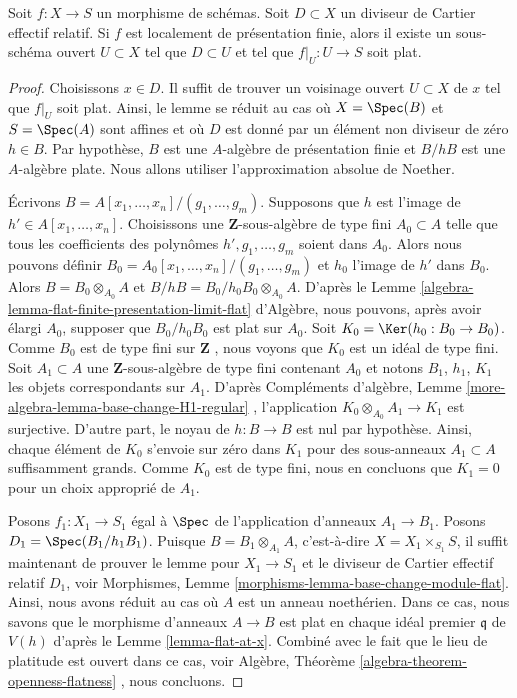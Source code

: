 \begin{lemma}
\label{lemma-flat-relative-Cartier-divisor}
Soit  $f : X \to S$  un morphisme de schémas. Soit  $D \subset X$  un diviseur de
Cartier effectif relatif. Si  $f$  est localement de présentation finie,
alors il existe un sous-schéma ouvert  $U \subset X$  tel que  $D \subset U$  et tel que
 $f|_U : U \to S$  soit plat.
\end{lemma}

\begin{proof}
Choisissons  $x \in D$. Il suffit de trouver un voisinage ouvert  $U \subset X$  de
 $x$  tel que  $f|_U$  soit plat. Ainsi, le lemme se réduit au cas où
 $X = \Spec(B)$  et  $S = \Spec(A)$  sont affines et où  $D$  est donné par un
élément non diviseur de zéro  $h \in B$. Par hypothèse,  $B$  est une
 $A$-algèbre de présentation finie et  $B/hB$  est une
 $A$-algèbre plate. Nous allons utiliser l'approximation absolue de
Noether.

\medskip\noindent
Écrivons  $B = A[x_1, \ldots, x_n]/(g_1, \ldots, g_m)$. Supposons que  $h$  est l'image de  $h' \in A[x_1, \ldots, x_n]$.
Choisissons une  $\mathbf{Z}$-sous-algèbre de type fini  $A_0 \subset A$  telle que tous les
coefficients des polynômes  $h', g_1, \ldots, g_m$  soient dans  $A_0$. Alors nous
pouvons définir  $B_0 = A_0[x_1, \ldots, x_n]/(g_1, \ldots, g_m)$  et  $h_0$  l'image de  $h'$  dans
 $B_0$. Alors  $B = B_0 \otimes_{A_0} A$  et  $B/hB = B_0/h_0B_0 \otimes_{A_0} A$. D'après le Lemme  \ref{algebra-lemma-flat-finite-presentation-limit-flat} 
d'Algèbre, nous pouvons, après avoir élargi  $A_0$, supposer que
 $B_0/h_0B_0$  est plat sur  $A_0$. Soit  $K_0 = \Ker(h_0 : B_0 \to B_0)$. Comme  $B_0$  est
de type fini sur  $\mathbf{Z}$ , nous voyons que  $K_0$  est un idéal de type
fini. Soit  $A_1 \subset A$  une  $\mathbf{Z}$-sous-algèbre de type fini contenant
 $A_0$  et notons  $B_1$,  $h_1$,  $K_1$  les objets
correspondants sur  $A_1$. D'après Compléments d'algèbre, Lemme  \ref{more-algebra-lemma-base-change-H1-regular} ,
l'application  $K_0 \otimes_{A_0} A_1 \to K_1$  est surjective. D'autre part, le noyau de  $h : B \to B$ 
est nul par hypothèse. Ainsi, chaque élément de  $K_0$  s'envoie sur zéro
dans  $K_1$  pour des sous-anneaux  $A_1 \subset A$ suffisamment grands. Comme
 $K_0$  est de type fini, nous en concluons que  $K_1 = 0$  pour un choix
approprié de  $A_1$.

\medskip\noindent
Posons  $f_1 : X_1 \to S_1$  égal à  $\Spec$  de l'application d'anneaux  $A_1 \to B_1$. Posons
 $D_1 = \Spec(B_1/h_1B_1)$. Puisque  $B = B_1 \otimes_{A_1} A$, c'est-à-dire  $X = X_1 \times_{S_1} S$, il suffit
maintenant de prouver le lemme pour  $X_1 \to S_1$  et le diviseur de Cartier
effectif relatif  $D_1$, voir Morphismes, Lemme  \ref{morphisms-lemma-base-change-module-flat}. Ainsi, nous
avons réduit au cas où  $A$  est un anneau noethérien. Dans ce cas, nous
savons que le morphisme d'anneaux  $A \to B$  est plat en chaque idéal premier
 $\mathfrak q$  de  $V(h)$  d'après le Lemme  \ref{lemma-flat-at-x}. Combiné avec le fait
que le lieu de platitude est ouvert dans ce cas, voir Algèbre, Théorème
 \ref{algebra-theorem-openness-flatness} , nous concluons.
\end{proof}

